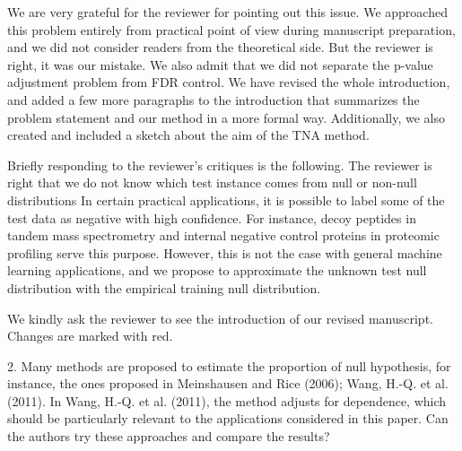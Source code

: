 \documentclass{article}
\newcommand{\response}[1]{\vspace*{1ex} \color{blue} \noindent #1 \color{black}
\vspace*{2ex}}
\begin{document}
\response{We are very grateful for the reviewer for pointing out this issue. We approached this problem entirely from practical point of view during manuscript preparation, and we did not consider readers from the theoretical side. But the reviewer is right, it was our mistake. We also admit that we did not separate the p-value adjustment problem from FDR control. We have revised the whole introduction, and added a few more paragraphs to the introduction that summarizes the problem statement and our method in a more formal way. Additionally, we also created and included a sketch about the aim of the TNA method.
	
Briefly responding to the reviewer's critiques is the following. The reviewer is right that we do not know which test instance comes from null or non-null distributions  In certain practical applications, it is possible to label some of the test data as negative with high confidence. For instance, decoy peptides\cite{elias2007target} in tandem mass spectrometry and internal negative control proteins \cite{gao2023simultaneous} in proteomic profiling serve this purpose. However, this is not the case with general machine learning applications, and we propose to approximate the unknown test null distribution with the empirical training null distribution. 

We kindly ask the reviewer to see the introduction of  our revised manuscript. Changes are marked with red.}

2. Many methods are proposed to estimate the proportion of null hypothesis, for instance, the ones proposed in Meinshausen and Rice (2006); Wang, H.-Q. et al. (2011). In Wang, H.-Q. et al. (2011), the method adjusts for dependence, which should be particularly relevant to the applications considered in this paper. Can the authors try these approaches and compare the results?
\end{document}
